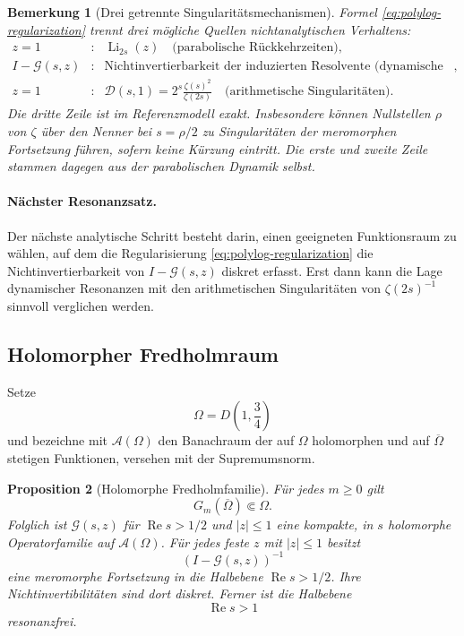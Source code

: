 \documentclass[11pt,a4paper]{article}
\newtheorem{remark}{Bemerkung}[section]
\newtheorem{proposition}[remark]{Proposition}
\begin{document}
\begin{remark}[Drei getrennte Singularitätsmechanismen]
Formel \eqref{eq:polylog-regularization} trennt drei mögliche Quellen
nichtanalytischen Verhaltens:
\[
 \begin{array}{rcl}
 z=1
 &:&
 \operatorname{Li}_{2s}(z)
 \quad\text{(parabolische Rückkehrzeiten)},\\[2mm]
 I-\mathcal G(s,z)
 &:&
 \text{Nichtinvertierbarkeit der induzierten Resolvente
 (dynamische Resonanzen)},\\[2mm]
 z=1
 &:&
 \displaystyle
 \mathscr D(s,1)=2^s\frac{\zeta(s)^2}{\zeta(2s)}
 \quad\text{(arithmetische Singularitäten).}
 \end{array}
\]
Die dritte Zeile ist im Referenzmodell exakt. Insbesondere können
Nullstellen $\rho$ von $\zeta$ über den Nenner bei
$s=\rho/2$ zu Singularitäten der meromorphen Fortsetzung führen,
sofern keine Kürzung eintritt. Die erste und zweite Zeile stammen
dagegen aus der parabolischen Dynamik selbst.
\end{remark}

\paragraph{Nächster Resonanzsatz.}
Der nächste analytische Schritt besteht darin, einen geeigneten
Funktionsraum zu wählen, auf dem die Regularisierung
\eqref{eq:polylog-regularization} die Nichtinvertierbarkeit von
$I-\mathcal G(s,z)$ diskret erfasst. Erst dann kann die Lage dynamischer
Resonanzen mit den arithmetischen Singularitäten von
$\zeta(2s)^{-1}$ sinnvoll verglichen werden.

\subsection{Holomorpher Fredholmraum}

Setze
\[
 \Omega=D\!\left(1,\frac34\right)
\]
und bezeichne mit $\mathcal A(\Omega)$ den Banachraum der auf
$\Omega$ holomorphen und auf $\overline\Omega$ stetigen Funktionen,
versehen mit der Supremumsnorm.

\begin{proposition}[Holomorphe Fredholmfamilie]
Für jedes $m\ge0$ gilt
\[
 G_m(\overline\Omega)\Subset\Omega.
\]
Folglich ist $\mathcal G(s,z)$ für
$\operatorname{Re}s>1/2$ und $|z|\le1$ eine kompakte, in $s$
holomorphe Operatorfamilie auf $\mathcal A(\Omega)$. Für jedes feste
$z$ mit $|z|\le1$ besitzt
\[
 (I-\mathcal G(s,z))^{-1}
\]
eine meromorphe Fortsetzung in die Halbebene
$\operatorname{Re}s>1/2$. Ihre Nichtinvertibilitäten sind dort diskret.
Ferner ist die Halbebene
\[
 \operatorname{Re}s>1
\]
resonanzfrei.
\end{proposition}
\end{document}
